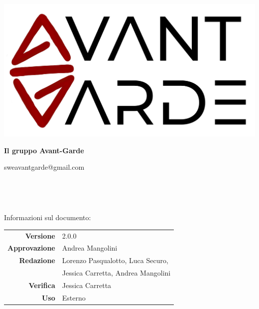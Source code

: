     \begin{titlepage}
        \begin{center}
            \includegraphics[width=\textwidth]{logo+scritta.png}

            \vspace{0.5cm}
            {\huge \textbf{Il gruppo Avant-Garde}}

            \vspace{0.4cm}
            \large{sweavantgarde@gmail.com}

            \vspace{1.5cm}
            \hrulefill\\
            \vspace{0.2cm}
            
            \textbf{\titoloDocumento}\\
            \vspace{0.1cm}
            \hrulefill

            \vfill
            Informazioni sul documento:\\
            \vspace{0.3cm}
                \begin{tabular}{ r | l }
                    \textbf{Versione} & 2.0.0\\ %
                    \textbf{Approvazione} & Andrea Mangolini\\ %
                    \textbf{Redazione} & Lorenzo Pasqualotto, Luca Securo, \\
                    & Jessica Carretta, Andrea Mangolini\\ %
                    \textbf{Verifica} & Jessica Carretta\\ %
                    \textbf{Uso} & Esterno\\ %
                \end{tabular}
        \end{center}
    \end{titlepage}
\restoregeometry